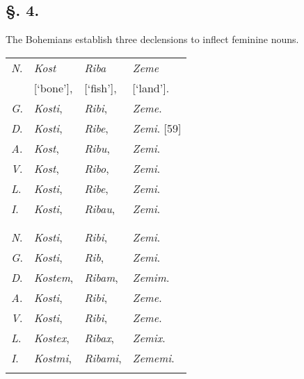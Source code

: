 \newpage

\subsection*{\hspace*{\fill}§. 4.\hspace*{\fill}}

The Bohemians establish three declensions to inflect feminine nouns.

\begin{longtable}{ l l l l }
    \lsptoprule
    \multicolumn{4}{ c }{Singular.} \\
    \midrule
    \textit{N}. & \textit{Kost} & \textit{Riba} & \textit{Zeme} \\
    & [‘bone’], & [‘fish’], & [‘land’]. \\
    \textit{G}. & \textit{Kosti}, & \textit{Ribi}, & \textit{Zeme}. \\
    \textit{D}. & \textit{Kosti}, & \textit{Ribe}, & \textit{Zemi}. [59] \\ 
    \textit{A}. & \textit{Kost}, & \textit{Ribu}, & \textit{Zemi}. \\
    \textit{V}. & \textit{Kost}, & \textit{Ribo}, & \textit{Zemi}. \\
    \textit{L}. & \textit{Kosti}, & \textit{Ribe}, & \textit{Zemi}. \\
    \textit{I}. & \textit{Kosti}, & \textit{Ribau}, & \textit{Zemi}. \\
    \lspbottomrule
    \\
    \lsptoprule
    \multicolumn{4}{ c }{Plural.} \\
    \midrule
    \textit{N}. & \textit{Kosti}, & \textit{Ribi}, & \textit{Zemi}. \\
    \textit{G}. & \textit{Kosti}, & \textit{Rib}, & \textit{Zemi}. \\
    \textit{D}. & \textit{Kostem}, & \textit{Ribam}, & \textit{Zemim}. \\ 
    \textit{A}. & \textit{Kosti}, & \textit{Ribi}, & \textit{Zeme}. \\
    \textit{V}. & \textit{Kosti}, & \textit{Ribi}, & \textit{Zeme}. \\
    \textit{L}. & \textit{Kostex}, & \textit{Ribax}, & \textit{Zemix}. \\
    \textit{I}. & \textit{Kostmi}, & \textit{Ribami}, & \textit{Zememi}. \\
    \lspbottomrule
\end{longtable}

